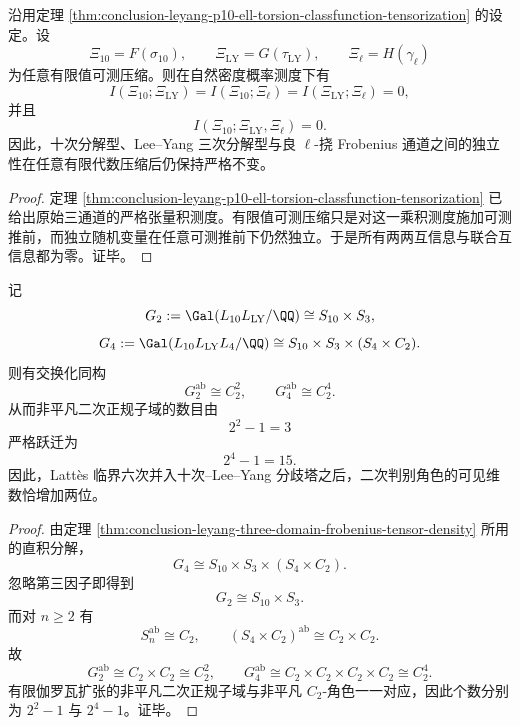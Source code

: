 \begin{corollary}[有限压缩下的严格零互信息]\label{cor:conclusion-leyang-p10-ell-torsion-finite-compression-zero-mutual-information}
沿用定理 \ref{thm:conclusion-leyang-p10-ell-torsion-classfunction-tensorization} 的设定。设
\[
\Xi_{10}=F(\sigma_{10}),
\qquad
\Xi_{\mathrm{LY}}=G(\tau_{\mathrm{LY}}),
\qquad
\Xi_\ell=H(\gamma_\ell)
\]
为任意有限值可测压缩。则在自然密度概率测度下有
\[
I(\Xi_{10};\Xi_{\mathrm{LY}})
=
I(\Xi_{10};\Xi_\ell)
=
I(\Xi_{\mathrm{LY}};\Xi_\ell)
=0,
\]
并且
\[
I(\Xi_{10};\Xi_{\mathrm{LY}},\Xi_\ell)=0.
\]
因此，十次分解型、Lee--Yang 三次分解型与良 \(\ell\)-挠 Frobenius 通道之间的独立性在任意有限代数压缩后仍保持严格不变。
\end{corollary}
\begin{proof}
定理 \ref{thm:conclusion-leyang-p10-ell-torsion-classfunction-tensorization} 已给出原始三通道的严格张量积测度。有限值可测压缩只是对这一乘积测度施加可测推前，而独立随机变量在任意可测推前下仍然独立。于是所有两两互信息与联合互信息都为零。证毕。
\end{proof}

\begin{theorem}\label{thm:conclusion-leyang-lattes-quadratic-character-rank-jump}
记
\[
G_2:=\Gal(L_{10}L_{\mathrm{LY}}/\QQ)\cong S_{10}\times S_3,
\]
\[
G_4:=\Gal(L_{10}L_{\mathrm{LY}}L_4/\QQ)\cong S_{10}\times S_3\times (S_4\times C_2).
\]
则有交换化同构
\[
G_2^{\mathrm{ab}}\cong C_2^2,
\qquad
G_4^{\mathrm{ab}}\cong C_2^4.
\]
从而非平凡二次正规子域的数目由
\[
2^2-1=3
\]
严格跃迁为
\[
2^4-1=15.
\]
因此，Latt\`es 临界六次并入十次--Lee--Yang 分歧塔之后，二次判别角色的可见维数恰增加两位。
\end{theorem}
\begin{proof}
由定理 \ref{thm:conclusion-leyang-three-domain-frobenius-tensor-density} 所用的直积分解，
\[
G_4\cong S_{10}\times S_3\times (S_4\times C_2).
\]
忽略第三因子即得到
\[
G_2\cong S_{10}\times S_3.
\]
而对 \(n\ge 2\) 有
\[
S_n^{\mathrm{ab}}\cong C_2,
\qquad
(S_4\times C_2)^{\mathrm{ab}}\cong C_2\times C_2.
\]
故
\[
G_2^{\mathrm{ab}}\cong C_2\times C_2\cong C_2^2,
\qquad
G_4^{\mathrm{ab}}\cong C_2\times C_2\times C_2\times C_2\cong C_2^4.
\]
有限伽罗瓦扩张的非平凡二次正规子域与非平凡 \(C_2\)-角色一一对应，因此个数分别为 \(2^2-1\) 与 \(2^4-1\)。证毕。
\end{proof}

